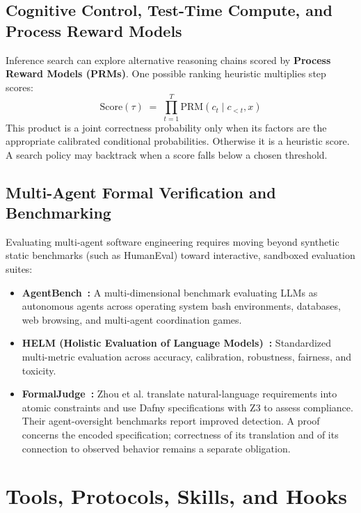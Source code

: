 \documentclass[11pt,a4paper]{article}
\begin{document}
\subsection{Cognitive Control, Test-Time Compute, and Process Reward Models}

Inference search can explore alternative reasoning chains scored by \textbf{Process Reward Models (PRMs)}. One possible ranking heuristic multiplies step scores:
\begin{equation}
\mathrm{Score}(\tau) \;=\; \prod_{t=1}^T \mathrm{PRM}(c_t \mid c_{<t}, x)
\end{equation}
This product is a joint correctness probability only when its factors are the appropriate calibrated conditional probabilities. Otherwise it is a heuristic score. A search policy may backtrack when a score falls below a chosen threshold.

\subsection{Multi-Agent Formal Verification and Benchmarking}

Evaluating multi-agent software engineering requires moving beyond synthetic static benchmarks (such as HumanEval) toward interactive, sandboxed evaluation suites:
\begin{itemize}[leftmargin=1.8em,itemsep=2pt]
  \item \textbf{AgentBench~:} A multi-dimensional benchmark evaluating LLMs as autonomous agents across operating system bash environments, databases, web browsing, and multi-agent coordination games.
  \item \textbf{HELM (Holistic Evaluation of Language Models)~:} Standardized multi-metric evaluation across accuracy, calibration, robustness, fairness, and toxicity.
  \item \textbf{FormalJudge~:} Zhou et al. translate natural-language requirements into atomic constraints and use Dafny specifications with Z3 to assess compliance. Their agent-oversight benchmarks report improved detection. A proof concerns the encoded specification; correctness of its translation and of its connection to observed behavior remains a separate obligation.
\end{itemize}

\section{Tools, Protocols, Skills, and Hooks}\label{sec:prereq-hypervisors}
\end{document}
